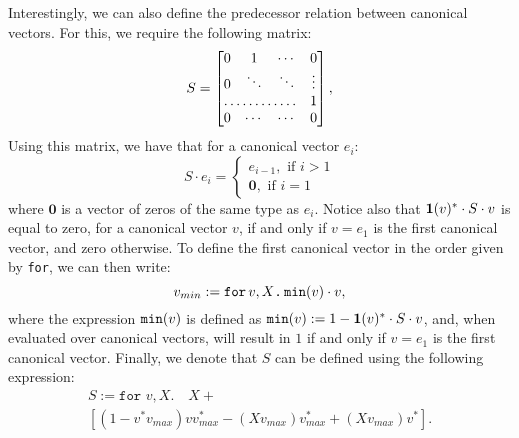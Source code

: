 Interestingly, we can also define the predecessor relation between canonical vectors. For this, we require the following matrix:
\[
S = \begin{bmatrix}
    0 & 1 & \cdots &  0 \\
    0 & \ddots & \ddots & \vdots \\
    \hdotsfor{3} & 1 \\
    0 & \cdots & \cdots & 0
\end{bmatrix},
\] 
Using this matrix, we have that for a canonical vector $e_i$:
\[
  			S\cdot e_i=\begin{cases}
               e_{i-1}, \text{ if } i > 1 \\
              \mathbf{0}, \text{ if } i = 1
            \end{cases}
		\]
where $\mathbf{0}$ is a vector of zeros of the same type as $e_i$. Notice also that $\mathbf{1}(v)^*\cdot S \cdot v$ is equal to zero, for a canonical vector $v$, if and only if $v = e_1$ is the first canonical vector, and zero otherwise. To define the first canonical vector in the order given by \texttt{for}, we can then write:
$$v_{min} := \texttt{for}\, v,X \texttt{.}\, \texttt{min}(v)\cdot v,$$
where the expression $\texttt{min}(v)$ is defined as $\texttt{min}(v) := 1 - \mathbf{1}(v)^*\cdot S \cdot v$, and, when evaluated over canonical vectors, will result in $1$ if and only if $v=e_1$ is the first canonical vector. Finally, we denote that $S$ can be defined using the following \langfor expression:
\begin{multline*}
S:= \texttt{for }v,X.\quad X + \\
\left[ (1 - v^*v_{max})vv_{max}^* - (Xv_{max}) v_{max}^* + (Xv_{max})v^*\right].
\end{multline*}

